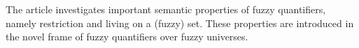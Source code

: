 
The article investigates important semantic properties of fuzzy quantifiers, namely restriction and living on a (fuzzy) set. These properties are introduced in the novel frame of fuzzy quantifiers over fuzzy universes.


